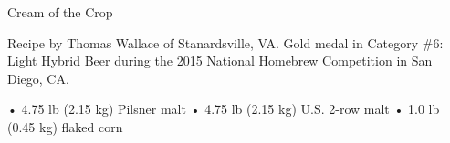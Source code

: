 \documentclass[parskip=half,fontsize=9pt,oneside]{scrbook}
\begin{document}
\mainmatter


\begin{recipe}{Cream of the Crop}

\begin{aboutblock}
Recipe by Thomas Wallace of Stanardsville, VA. Gold medal in Category \#6: Light
Hybrid Beer during the 2015 National Homebrew Competition in San Diego, CA.
\sourceaha
\end{aboutblock}


\begin{methodandtiming}

\begin{mashsteps}
\end{mashsteps}

\begin{fermentationsteps}
\end{fermentationsteps}

\end{methodandtiming}

\recipebreak

\begin{ingredientsblock}

    • 4.75 lb (2.15 kg) Pilsner malt 
    • 4.75 lb (2.15 kg) U.S. 2-row malt 
    • 1.0 lb (0.45 kg) flaked corn 

\begin{malts}
\end{malts}

\begin{hops}
\end{hops}


\end{ingredientsblock}

\end{recipe}


\end{document}

